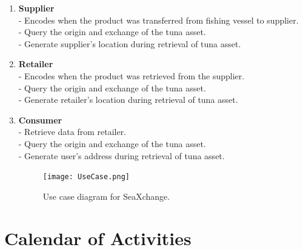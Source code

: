 \begin{itemize}
\begin{enumerate}
			\item \textbf{Supplier}
			\\- Encodes when the product was transferred from fishing vessel to supplier.
			\\- Query the origin and exchange of the tuna asset.
			\\- Generate supplier's location during retrieval of tuna asset.
			
			\item \textbf{Retailer}
			\\- Encodes when the product was retrieved from the supplier.
			\\- Query the origin and exchange of the tuna asset.
			\\- Generate retailer's location during retrieval of tuna asset.
			
			\item \textbf{Consumer}
			\\- Retrieve data from retailer.
			\\- Query the origin and exchange of the tuna asset.
			\\- Generate user's address during retrieval of tuna asset.
		
			\begin{figure}[h]  
				\centering
				\texttt{[image: UseCase.png]}
				\caption{Use case diagram for SeaXchange.}
				\label{fig:usecase}  
			\end{figure}
			
		\end{enumerate}
	\end{itemize}

\clearpage
\newpage
\section{Calendar of Activities}
%
%
\newcommand{\weekone}{\textbullet}
\newcommand{\weektwo}{\textbullet \textbullet}
\newcommand{\weekthree}{\textbullet \textbullet \textbullet}
\newcommand{\weekfour}{\textbullet \textbullet \textbullet \textbullet}

%
%

